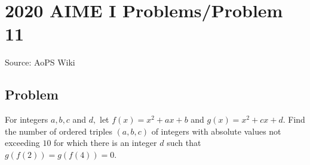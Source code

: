 \documentclass[12pt]{article}
\begin{document}
\section*{{2020 AIME I Problems/Problem 11}}
Source: AoPS Wiki

\subsection*{Problem}
For integers $a,b,c$ and $d,$ let $f(x)=x^2+ax+b$ and $g(x)=x^2+cx+d.$ Find the number of ordered triples $(a,b,c)$ of integers with absolute values not exceeding $10$ for which there is an integer $d$ such that $g(f(2))=g(f(4))=0.$
\end{document}
